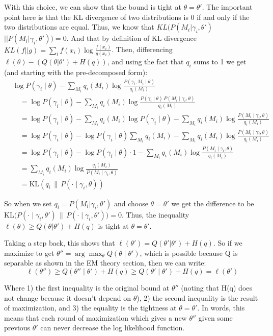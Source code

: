 \documentclass[11pt]{article}
\begin{document}
With this choice, we can show that the bound is tight at $\theta = \theta'$. The important point here is that the KL divergence of two distributions is 0 if and only if the two distributions are equal. Thus, we know that $KL(P(M_i | \gamma_i, \theta')$ $||  P(M_i | \gamma_i, \theta')) = 0$. And that by definition of KL divergence $KL(f||g) = \sum_i f(x_i) \log \frac{f(x_i)}{g(x_i)}$. Then, differencing $\ell(\theta) - (Q(\theta | \theta') + H(q))$, and using the fact that $q_i$ sums to 1 we get (and starting with the pre-decomposed form):
\[
\begin{aligned}
&\log P(\gamma_i \mid \theta) - \sum_{M_i} q_i(M_i)\log\frac{P(\gamma_i, M_i \mid \theta)}{q_i(M_i)} \\
&\quad= \log P(\gamma_i \mid \theta) - \sum_{M_i} q_i(M_i)\log\frac{P(\gamma_i \mid \theta)\,P(M_i \mid \gamma_i, \theta)}{q_i(M_i)} \\
&\quad= \log P(\gamma_i \mid \theta) - \sum_{M_i} q_i(M_i)\log P(\gamma_i \mid \theta) - \sum_{M_i} q_i(M_i)\log\frac{P(M_i \mid \gamma_i, \theta)}{q_i(M_i)} \\
&\quad= \log P(\gamma_i \mid \theta) - \log P(\gamma_i \mid \theta)\sum_{M_i} q_i(M_i) - \sum_{M_i} q_i(M_i)\log\frac{P(M_i \mid \gamma_i, \theta)}{q_i(M_i)} \\
&\quad= \log P(\gamma_i \mid \theta) - \log P(\gamma_i \mid \theta) \cdot 1 - \sum_{M_i} q_i(M_i)\log\frac{P(M_i \mid \gamma_i, \theta)}{q_i(M_i)} \\
&\quad= \sum_{M_i} q_i(M_i)\log\frac{q_i(M_i)}{P(M_i \mid \gamma_i, \theta)} \\
&\quad= \mathrm{KL}\left(q_i \,\|\, P(\cdot \mid \gamma_i, \theta)\right)
\end{aligned}
\]

So when we set $q_i = P(M_i | \gamma_i, \theta')$ and choose $\theta = \theta'$ we get the difference to be $\mathrm{KL}\big(P(\cdot \mid \gamma_i, \theta') \,\|\, P(\cdot \mid \gamma_i, \theta')\big) = 0$. Thus, the inequality $\ell(\theta) \geq Q(\theta | \theta') + H(q)$ is tight at $\theta = \theta'$.

Taking a step back, this shows that $\ell(\theta') = Q(\theta' | \theta') + H(q)$. So if we maximize to get $\theta'' = \arg\max_{\theta} Q(\theta \mid \theta')$, which is possible because Q is separable as shown in the EM theory section, then we can write:
\[
\ell(\theta'') \geq Q(\theta'' \mid \theta') + H(q) \geq Q(\theta' \mid \theta') + H(q) = \ell(\theta')
\]

Where 1) the first inequality is the original bound at $\theta''$ (noting that H(q) does not change because it doesn't depend on $\theta$), 2) the second inequality is the result of maximization, and 3) the equality is the tightness at $\theta = \theta'$. In words, this means that each round of maximization which gives a new $\theta''$ given some previous $\theta'$ can never decrease the log likelihood function.
\end{document}
